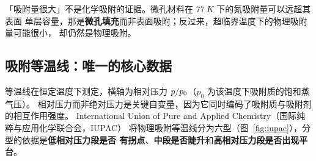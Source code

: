 \begin{pitfall}
「吸附量很大」不是化学吸附的证据。微孔材料在 $\qty{77}{K}$ 下的氮吸附量可以远超其表面
单层容量，那是\textbf{微孔填充}而非表面吸附；反过来，超临界温度下的物理吸附量可能很小，
却仍然是物理吸附。
\end{pitfall}

\subsection{吸附等温线：唯一的核心数据}

等温线在恒定温度下测定，横轴为相对压力 $p/p_{0}$（$p_0$ 为该温度下吸附质的饱和蒸气压）。
相对压力而非绝对压力是关键自变量，因为它同时编码了吸附质与吸附剂的相互作用强度。
International Union of Pure and Applied Chemistry（国际纯粹与应用化学联合会，IUPAC）
将物理吸附等温线分为六型（图~\ref{fig:iupac}），分型的依据是\textbf{低相对压力段是否
有拐点}、\textbf{中段是否陡升}和\textbf{高相对压力段是否出现平台}。


